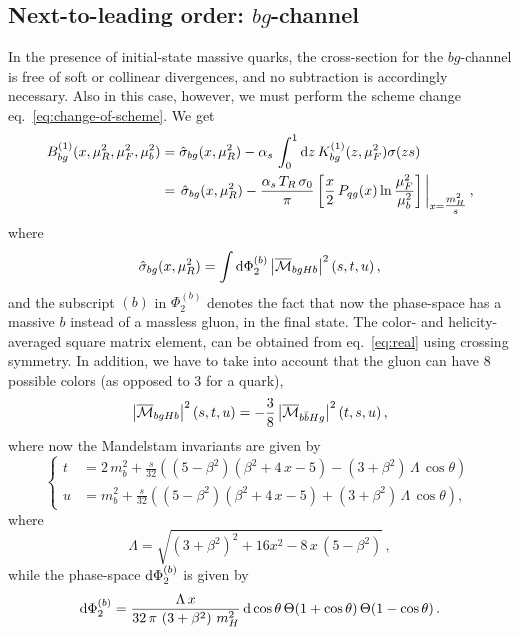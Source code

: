 \subsection{Next-to-leading order: $bg$-channel}
In the presence of initial-state massive quarks, the cross-section for
the $bg$-channel is free of  soft or 
collinear divergences, and no subtraction is accordingly
necessary. Also in this case, however, we must  perform the scheme
change eq.~\eqref{eq:change-of-scheme}. We get
\begin{equation}
  \begin{split}
    B_{bg}^{(1)}(x,\mu_R^2,\mu_F^2,\mu_b^2) & = \hat{\sigma}_{bg}(x,\mu_R^2)
    - \alpha_s\,\int_0^1{\rm d}z\, K_{bg}^{(1)}(z,\mu_F^2)\sigma(zs)\,\\
    & = \left. \hat{\sigma}_{bg}(x,\mu_R^2) - \frac{\alpha_s\,
        T_R\,\sigma_0}{\pi}\left[ \frac{x}{2}\,P_{qg}(x)
        \ln{\frac{\mu_F^2}{\mu_b^2}}\right]\,\right|_{x=\tfrac{m_H^2}{s}},
  \end{split}
\end{equation}
where
\begin{equation}
  \hat{\sigma}_{bg}(x,\mu_R^2) = \int{\rm d}\Phi_2^{(b)}
  \left| \overline{{\cal M}}_{bgHb} \right|^2(s,t,u)\,,
\end{equation}
and the subscript $(b)$ in $\Phi_2^{(b)}$ denotes the fact that now
the phase-space has a massive $b$ instead of a massless gluon, in the
final state. The color- and helicity-averaged square matrix element,
can be obtained from eq.~\eqref{eq:real} using crossing symmetry. In
addition, we have to take into account that the gluon can have 8
possible colors (as opposed to 3 for a quark),
\begin{equation}
  \left| \overline{{\cal M}}_{bgHb} \right|^2(s,t,u)=
  - \frac{3}{8} \left| \overline{{\cal M}}_{b\bar{b}Hg} \right|^2(t,s,u)\,,
\end{equation}
where now the Mandelstam invariants are given by
\begin{equation}
  \left\{
    \begin{split}
      t &= 2\,m_b^2 +
      \frac{s}{32}\left((5-\beta^2)(\beta^2+4\,x-5) -
        (3+\beta^2)\,\Lambda\,\cos\theta\right)\\
      u &= m_b^2 +\frac{s}{32}\left((5-\beta^2)(\beta^2+4\,x-5) +
        (3+\beta^2)\,\Lambda\,\cos\theta\right), 
    \end{split}
  \right.\,
\end{equation}
where
\begin{equation}
  \Lambda = \sqrt{\left( 3+\beta^2 \right)^2 + 16 x^2 -
    8\,x\,\left(5-\beta^2\right)}\,,
\end{equation}
while the phase-space ${\rm d}\Phi_2^{(b)}$ is given by
\begin{equation}
  {\rm d}\Phi_2^{(b)} = \frac{\Lambda\,x}{32\,\pi\,\left( 3+\beta^2
    \right)\,m_H^2}\,{\rm d}\cos\theta\,
  \Theta(1+\cos\theta )\,\Theta(1-\cos\theta)\,.
\end{equation}

